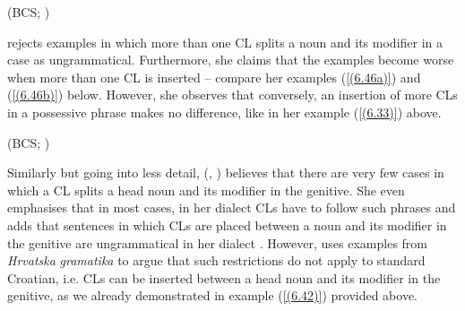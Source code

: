 \begin{exe}\ex\begin{xlist}
\hfill (BCS; \citealt[522]{MiseskaTomic96})
\end{xlist}
\end{exe}

\noindent \citet[418]{Progovac96} rejects examples in which more than one CL splits a noun and its modifier in a case as ungrammatical. Furthermore, she claims that the examples become worse when more than one CL is inserted \citep[cf.][419]{Progovac96} – compare her examples (\ref{(6.46a)}) and (\ref{(6.46b)}) below. However, she observes that conversely, an insertion of more CLs in a possessive phrase makes no difference, like in her example (\ref{(6.33)}) above. 

\begin{exe}
\strut\hfill  (BCS; \citealt[418]{Progovac96})

\end{exe}

\noindent Similarly but going into less detail,
\citeauthor{RadanovicKocic88} (\citeyear[114]{RadanovicKocic88}, \citeyear[436]{RadanovicKocic96}) believes that there are very few cases in which a CL splits a head noun and its modifier in the genitive. She even emphasises that in most cases, in her dialect CLs have to follow such phrases and adds that sentences in which CLs are placed between a noun and its modifier in the genitive are ungrammatical in her dialect \citep[cf.][436]{RadanovicKocic96}. However, \citet[54]{Alexander09} uses examples from \textit{Hrvatska} \textit{gramatika} \citep{Baric97} to argue that such restrictions do not apply to standard Croatian, i.e. CLs can be inserted between a head noun and its modifier in the genitive, as we already demonstrated in example (\ref{(6.42)}) provided above.


